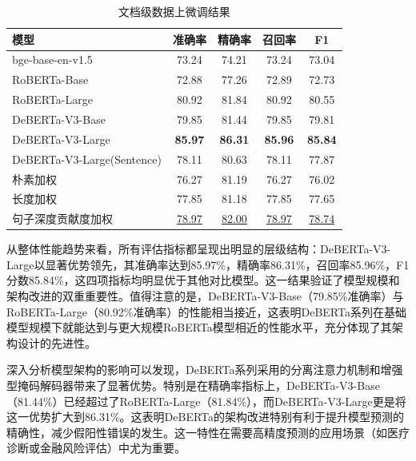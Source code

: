 \begin{table}[htbp]
\caption{文档级数据上微调结果}
\centering
\begin{tabular}{l|cccc}
\toprule
\textbf{模型}& \textbf{准确率}   & \textbf{精确率}    & \textbf{召回率}    & \textbf{F1}   \\ \midrule
bge-base-en-v1.5 \cite{bge_embedding} & 73.24          & 74.21          & 73.24          & 73.04          \\
RoBERTa-Base \cite{liu_roberta_2019}  & 72.88          & 77.26          & 72.89          & 72.73          \\
RoBERTa-Large \cite{liu_roberta_2019} & 80.92          & 81.84          & 80.92          & 80.55          \\
DeBERTa-V3-Base \cite{he2023debertav3improvingdebertausing} & 79.85          & 81.44          & 79.85          & 79.81          \\
DeBERTa-V3-Large \cite{he2023debertav3improvingdebertausing} & \textbf{85.97} & \textbf{86.31} & \textbf{85.96} & \textbf{85.84} \\ \midrule
DeBERTa-V3-Large\cite{he2023debertav3improvingdebertausing}(Sentence)  & 78.11 & 80.63 & 78.11 & 77.87 \\
朴素加权 & 76.27 & 81.19 & 76.27 & 76.02 \\
长度加权 & 77.85 & 81.18 & 77.85 & 77.65 \\
句子深度贡献度加权 & \uline{78.97} & \uline{82.00} & \uline{78.97} & \uline{78.74} \\ \bottomrule
\end{tabular}
\label{tab:document}
\end{table}

从整体性能趋势来看，所有评估指标都呈现出明显的层级结构：DeBERTa-V3-Large以显著优势领先，其准确率达到85.97\%，精确率86.31\%，召回率85.96\%，F1分数85.84\%，这四项指标均明显优于其他对比模型。这一结果验证了模型规模和架构改进的双重重要性。值得注意的是，DeBERTa-V3-Base（79.85\%准确率）与RoBERTa-Large（80.92\%准确率）的性能相当接近，这表明DeBERTa系列在基础模型规模下就能达到与更大规模RoBERTa模型相近的性能水平，充分体现了其架构设计的先进性。

深入分析模型架构的影响可以发现，DeBERTa系列采用的分离注意力机制和增强型掩码解码器带来了显著优势。特别是在精确率指标上，DeBERTa-V3-Base（81.44\%）已经超过了RoBERTa-Large（81.84\%），而DeBERTa-V3-Large更是将这一优势扩大到86.31\%。这表明DeBERTa的架构改进特别有利于提升模型预测的精确性，减少假阳性错误的发生。这一特性在需要高精度预测的应用场景（如医疗诊断或金融风险评估）中尤为重要。

